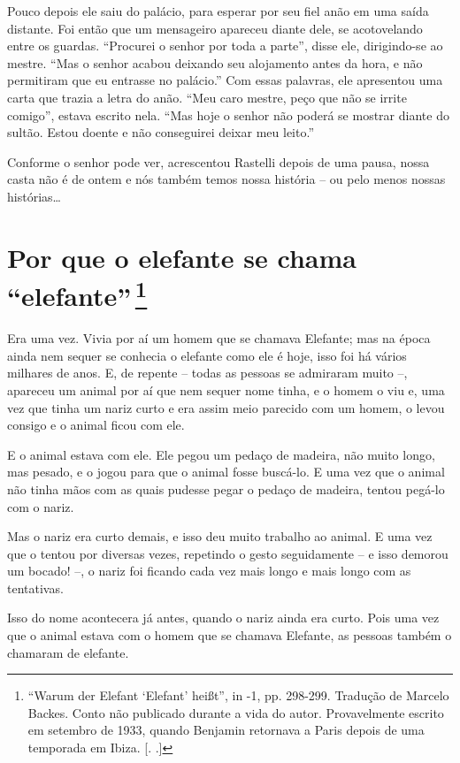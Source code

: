 Pouco depois ele saiu do palácio, para esperar por seu fiel anão em uma
saída distante. Foi então que um mensageiro apareceu diante dele, se
acotovelando entre os guardas. ``Procurei o senhor por toda a parte'',
disse ele, dirigindo-se ao mestre. ``Mas o senhor acabou deixando seu
alojamento antes da hora, e não permitiram que eu entrasse no palácio.''
Com essas palavras, ele apresentou uma carta que trazia a letra do anão.
``Meu caro mestre, peço que não se irrite comigo'', estava escrito nela.
``Mas hoje o senhor não poderá se mostrar diante do sultão. Estou doente
e não conseguirei deixar meu leito.''

Conforme o senhor pode ver, acrescentou Rastelli depois de uma pausa,
nossa casta não é de ontem e nós também temos nossa história -- ou pelo
menos nossas histórias\ldots{}

\chapter{Por que o elefante se chama ``elefante''\,\footnote[*]{``Warum der Elefant
  `Elefant' heißt'', in  -1, pp. 298-299. Tradução de Marcelo
  Backes. Conto não publicado durante a vida do autor. Provavelmente
  escrito em setembro de 1933, quando Benjamin retornava a Paris depois
  de uma temporada em Ibiza. [. .]} }

Era uma vez. Vivia por aí um homem que se chamava Elefante; mas na época
ainda nem sequer se conhecia o elefante como ele é hoje, isso foi há
vários milhares de anos. E, de repente -- todas as pessoas se admiraram
muito --, apareceu um animal por aí que nem sequer nome tinha, e o homem
o viu e, uma vez que tinha um nariz curto e era assim meio parecido com
um homem, o levou consigo e o animal ficou com ele.

E o animal estava com ele. Ele pegou um pedaço de madeira, não muito
longo, mas pesado, e o jogou para que o animal fosse buscá-lo. E uma vez
que o animal não tinha mãos com as quais pudesse pegar o pedaço de
madeira, tentou pegá-lo com o nariz.

Mas o nariz era curto demais, e isso deu muito trabalho ao animal. E uma
vez que o tentou por diversas vezes, repetindo o gesto seguidamente -- e
isso demorou um bocado! --, o nariz foi ficando cada vez mais longo e
mais longo com as tentativas.

Isso do nome acontecera já antes, quando o nariz ainda era curto. Pois
uma vez que o animal estava com o homem que se chamava Elefante, as
pessoas também o chamaram de elefante.

